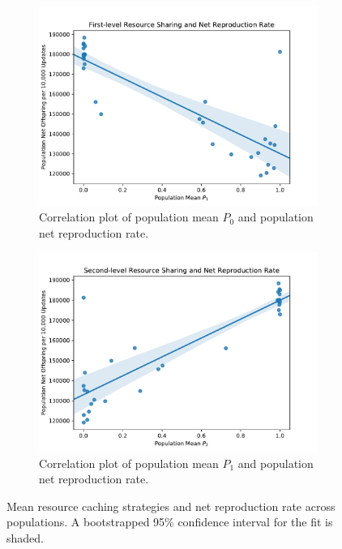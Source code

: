 \begin{figure}[!htbp]
\begin{center}

\begin{subfigure}[b]{0.5\columnwidth}
  \includegraphics[width=\columnwidth]{img/mean_res_pool1_vs_net_reproduction}
  \caption{
  Correlation plot of population mean $P_0$ and population net reproduction rate.
  }
  \label{fig:mean_res_pool1_vs_net_reproduction}
\end{subfigure}%
\begin{subfigure}[b]{0.5\columnwidth}
  \includegraphics[width=\columnwidth]{img/mean_res_pool2_vs_net_reproduction}
  \caption{
  Correlation plot of population mean $P_1$ and population net reproduction rate.
  }
  \label{fig:mean_res_pool2_vs_net_reproduction}
\end{subfigure}
\caption{
Mean resource caching strategies and net reproduction rate across populations.
A bootstrapped 95\% confidence interval for the fit is shaded.
}
\label{fig:net_reproduction}
\end{center}
\end{figure}

